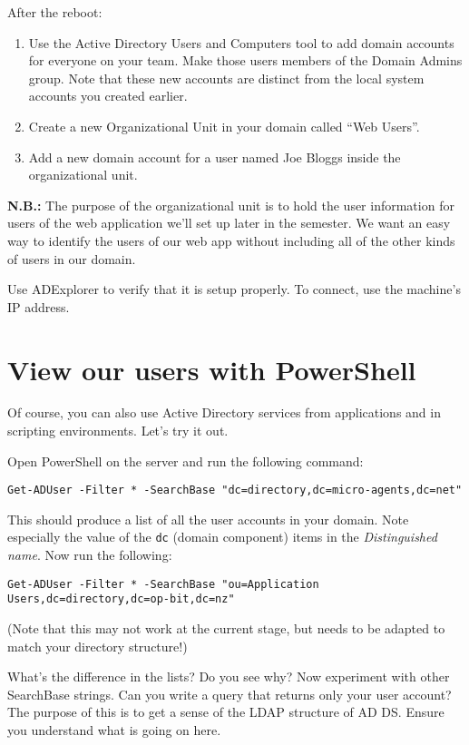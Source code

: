 \documentclass{article}
\begin{document}
After the reboot:
\begin{enumerate}
	\item Use the Active Directory Users and Computers tool to add domain accounts for everyone on your team.  Make those users members of the Domain Admins group. Note that these new accounts are distinct from the local system accounts you created earlier.
	\item Create a new Organizational Unit in your domain called ``Web Users''. %
	\item Add a new domain account for a user named Joe Bloggs inside the organizational unit.
\end{enumerate}

\textbf{N.B.:} The purpose of the organizational unit is to hold the user information for users of the web application we'll set up later in the semester. We want an easy way to identify the users of our web app without including all of the other kinds of users in our domain.

Use ADExplorer to verify that it is setup properly. To connect, use the machine's IP address.

\section{View our users with PowerShell}

Of course, you can also use Active Directory services from applications and in scripting environments. Let's try it out.

Open PowerShell on the server and run the following command: 

\texttt{Get-ADUser -Filter * -SearchBase "dc=directory,dc=micro-agents,dc=net"}

This should produce a list of all the user accounts in your domain.  Note especially the value of the \texttt{dc} (domain component) items in the \emph{Distinguished name}. Now run the following:

\texttt{Get-ADUser -Filter * -SearchBase "ou=Application Users,dc=directory,dc=op-bit,dc=nz"}

(Note that this may not work at the current stage, but needs to be adapted to match your directory structure!)

What's the difference in the lists? Do you see why?  Now experiment with other SearchBase strings. Can you write a query that returns only your user account? The purpose of this is to get a sense of the LDAP
structure of AD DS. Ensure you understand what is going on here.
\end{document}
